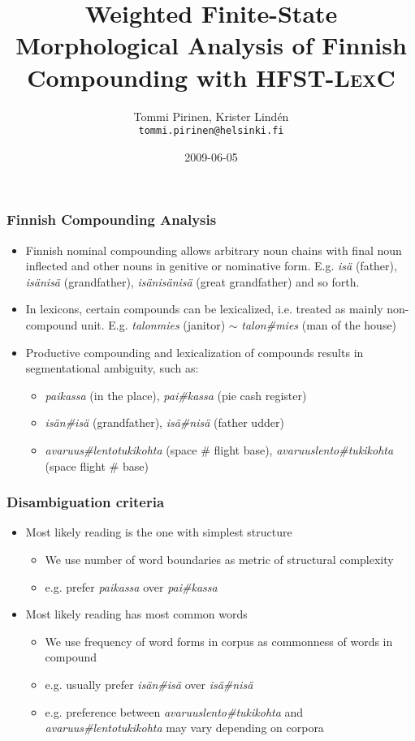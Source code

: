 \documentclass[utf8]{beamer}
\begin{document}
\title[Weighted Finnish Compounds with HFST-LexC]{Weighted Finite-State Morphological Analysis of Finnish Compounding with
\textsc{HFST-LexC}}
\author[Tommi Pirinen]{Tommi Pirinen, Krister Lindén\\ \texttt{tommi.pirinen@helsinki.fi}}
\date{2009-06-05}


\begin{frame}
\titlepage
\end{frame}

\begin{frame}
\frametitle{Finnish Compounding Analysis}
\begin{itemize}
\item Finnish nominal compounding allows arbitrary noun chains with final noun
inflected and other nouns in genitive or nominative form.
E.g. \emph{isä} (father), \emph{isänisä} (grandfather), \emph{isänisänisä}
(great grandfather) and so forth.
\item In lexicons, certain compounds can be lexicalized, i.e. treated as mainly non-compound unit. E.g. \emph{talonmies} (janitor) $\sim$
\emph{talon\#mies} (man of the house)
\item Productive compounding and lexicalization of compounds results in segmentational ambiguity, such as:
\begin{itemize}
\item \emph{paikassa} (in the place), \emph{pai\#kassa} (pie cash register)
\item \emph{isän\#isä} (grandfather), \emph{isä\#nisä} (father udder)
\item \emph{avaruus\#lentotukikohta} (space \# flight base), \emph{avaruuslento\#tukikohta} (space flight \# base)
\end{itemize}
\end{itemize}
\end{frame}

\begin{frame}
\frametitle{Disambiguation criteria}
\begin{itemize}
\item Most likely reading is the one with simplest structure
\begin{itemize}
\item We use number of word boundaries as metric of structural complexity
\item e.g. prefer \emph{paikassa} over \emph{pai\#kassa}
\end{itemize}
\item Most likely reading has most common words
\begin{itemize}
\item We use frequency of word forms in corpus as commonness of words in compound
\item e.g. usually prefer \emph{isän\#isä} over \emph{isä\#nisä}
\item e.g. preference between \emph{avaruuslento\#tukikohta} and 
\emph{avaruus\#lentotukikohta} may vary depending on corpora
\end{itemize}
\end{itemize}
\end{frame}
\end{document}
